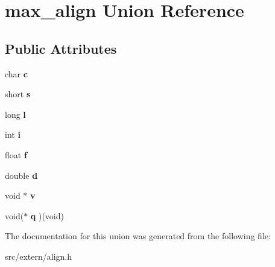 \hypertarget{unionmax__align}{\section{max\-\_\-align Union Reference}
\label{unionmax__align}
}
\subsection*{Public Attributes}
\begin{DoxyCompactItemize}
\item 
\hypertarget{unionmax__align_ae0f6c483820acb32266a5a03449874a1}{char {\bfseries c}}\label{unionmax__align_ae0f6c483820acb32266a5a03449874a1}

\item 
\hypertarget{unionmax__align_a786335ebeeca204d9abb1570f1fd9258}{short {\bfseries s}}\label{unionmax__align_a786335ebeeca204d9abb1570f1fd9258}

\item 
\hypertarget{unionmax__align_aec3ccee73d705da2b2fb4987a0cfb88c}{long {\bfseries l}}\label{unionmax__align_aec3ccee73d705da2b2fb4987a0cfb88c}

\item 
\hypertarget{unionmax__align_ae435683bc3acb9d7a5cb8a154e274ed0}{int {\bfseries i}}\label{unionmax__align_ae435683bc3acb9d7a5cb8a154e274ed0}

\item 
\hypertarget{unionmax__align_aef79c8eefe43f54bb746cb66094f9e69}{float {\bfseries f}}\label{unionmax__align_aef79c8eefe43f54bb746cb66094f9e69}

\item 
\hypertarget{unionmax__align_a348f5ea41f081f6fd243ffa6dd1bd820}{double {\bfseries d}}\label{unionmax__align_a348f5ea41f081f6fd243ffa6dd1bd820}

\item 
\hypertarget{unionmax__align_af33cdc78318cd53fd47d8f5331446d30}{void $\ast$ {\bfseries v}}\label{unionmax__align_af33cdc78318cd53fd47d8f5331446d30}

\item 
\hypertarget{unionmax__align_a7ed5d9e65c78c7b5acb2e064cf98e03a}{void($\ast$ {\bfseries q} )(void)}\label{unionmax__align_a7ed5d9e65c78c7b5acb2e064cf98e03a}

\end{DoxyCompactItemize}


The documentation for this union was generated from the following file\-:\begin{DoxyCompactItemize}
\item 
src/extern/align.\-h\end{DoxyCompactItemize}
